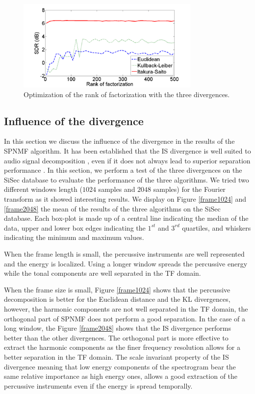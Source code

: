 \documentclass[journal]{IEEEtran}
\begin{document}
\begin{figure}[htb]

  \centering 
  \includegraphics[width=9cm]{fig/RankOfFact.png}
  \caption{\label{RankOfFact} Optimization of the rank of factorization with the three divergences.}
  
\end{figure}




\subsection{Influence of the divergence}\label{setup:divergence}

In this section we discuss the influence of the divergence in the results of the SPNMF algorithm. It has been established that the IS divergence is well suited to audio signal decomposition \cite{gray1980distortion}, even if it does not always lead to superior separation performance \cite{canadas2014percussive}. In this section, we perform a test of the three divergences on the SiSec database to evaluate the performance of the three algorithms. We tried two different windows length ($1024$ samples and $2048$ samples) for the Fourier transform as it showed interesting results. We display on Figure \ref{frame1024} and \ref{frame2048} the mean of the results of the three algorithms on the SiSec database. Each box-plot is made up of a central line indicating the median of the data, upper and lower box edges indicating the $1^{st}$ and $3^{rd}$ quartiles, and whiskers indicating the minimum and maximum values. 

When the frame length is small, the percussive instruments are well represented and the energy is localized. Using a longer window spreads the percussive energy while the tonal components are well separated in the TF domain.

When the frame size is small, Figure \ref{frame1024} shows that the percussive decomposition is better for the Euclidean distance and the KL divergences, however, the harmonic components are not well separated in the TF domain, the orthogonal part of SPNMF does not perform a good separation.  
In the case of a long window, the Figure \ref{frame2048} shows that the IS divergence performs better than the other divergences. The orthogonal part is more effective to extract the harmonic components as the finer frequency resolution allows for a better separation in the TF domain. The scale invariant property of the IS divergence meaning that low energy components of the spectrogram bear the same relative importance as high energy ones, allows a good extraction of the percussive instruments even if the energy is spread temporally.
\end{document}
